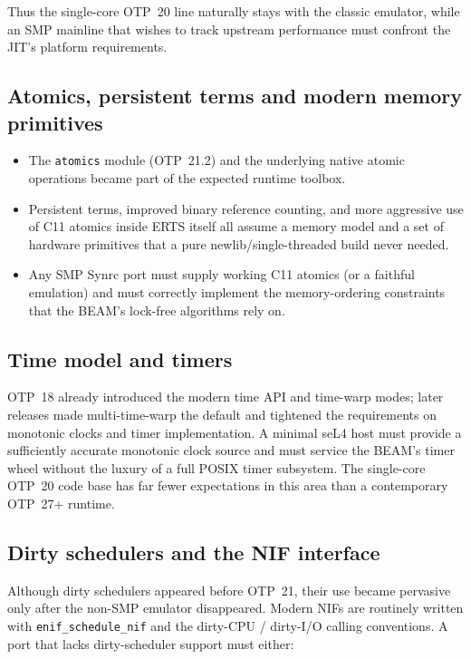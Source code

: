 \documentclass{article}
\begin{document}
Thus the single-core OTP~20 line naturally stays with the classic emulator, while an SMP mainline that wishes to track upstream performance must confront the JIT’s platform requirements.

\subsection{Atomics, persistent terms and modern memory primitives}

\begin{itemize}
  \item The \texttt{atomics} module (OTP~21.2) and the underlying native atomic operations became part of the expected runtime toolbox.
  \item Persistent terms, improved binary reference counting, and more aggressive use of C11 atomics inside ERTS itself all assume a memory model and a set of hardware primitives that a pure newlib/single-threaded build never needed.
  \item Any SMP Synrc port must supply working C11 atomics (or a faithful emulation) and must correctly implement the memory-ordering constraints that the BEAM’s lock-free algorithms rely on.
\end{itemize}

\subsection{Time model and timers}

OTP~18 already introduced the modern time API and time-warp modes; later releases made multi-time-warp the default and tightened the requirements on monotonic clocks and timer implementation.
A minimal seL4 host must provide a sufficiently accurate monotonic clock source and must service the BEAM’s timer wheel without the luxury of a full POSIX timer subsystem.
The single-core OTP~20 code base has far fewer expectations in this area than a contemporary OTP~27+ runtime.

\subsection{Dirty schedulers and the NIF interface}

Although dirty schedulers appeared before OTP~21, their use became pervasive only after the non-SMP emulator disappeared.
Modern NIFs are routinely written with \texttt{enif\_schedule\_nif} and the dirty-CPU / dirty-I/O calling conventions.
A port that lacks dirty-scheduler support must either:
\end{document}
